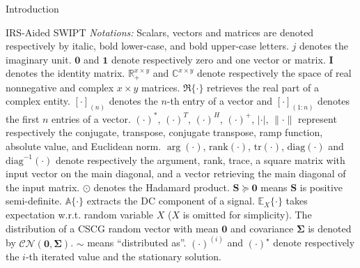 \documentclass[journal]{IEEEtran}
\begin{document}
\begin{section}{Introduction}
\begin{subsection}{IRS-Aided SWIPT}
			\emph{Notations:} Scalars, vectors and matrices are denoted respectively by italic, bold lower-case, and bold upper-case letters. $j$ denotes the imaginary unit. $\boldsymbol{0}$ and $\boldsymbol{1}$ denote respectively zero and one vector or matrix. $\boldsymbol{I}$ denotes the identity matrix. $\mathbb{R}_+^{x \times y}$ and $\mathbb{C}^{x \times y}$ denote respectively the space of real nonnegative and complex $x \times y$ matrices. $\Re\{\cdot\}$ retrieves the real part of a complex entity. $[\cdot]_{(n)}$ denotes the $n$-th entry of a vector and $[\cdot]_{(1:n)}$ denotes the first $n$ entries of a vector. $(\cdot)^*$, $(\cdot)^T$, $(\cdot)^H$, $(\cdot)^+$, $\lvert{\cdot}\rvert$, $\lVert{\cdot}\rVert$ represent respectively the conjugate, transpose, conjugate transpose, ramp function, absolute value, and Euclidean norm. $\arg(\cdot)$, $\mathrm{rank}(\cdot)$, $\mathrm{tr}(\cdot)$, $\mathrm{diag}(\cdot)$ and $\mathrm{diag}^{-1}(\cdot)$ denote respectively the argument, rank, trace, a square matrix with input vector on the main diagonal, and a vector retrieving the main diagonal of the input matrix. $\odot$ denotes the Hadamard product. $\boldsymbol{S} \succeq \boldsymbol{0}$ means $\boldsymbol{S}$ is positive semi-definite. $\mathbb{A}\{\cdot\}$ extracts the DC component of a signal. $\mathbb{E}_X\{\cdot\}$ takes expectation w.r.t. random variable $X$ ($X$ is omitted for simplicity). The distribution of a CSCG random vector with mean $\boldsymbol{0}$ and covariance $\boldsymbol{\Sigma}$ is denoted by $\mathcal{CN}(\boldsymbol{0},\boldsymbol{\Sigma})$. $\sim$ means ``distributed as''. $(\cdot)^{(i)}$ and $(\cdot)^{\star}$ denote respectively the $i$-th iterated value and the stationary solution.
		\end{subsection}
	\end{section}
\end{document}
